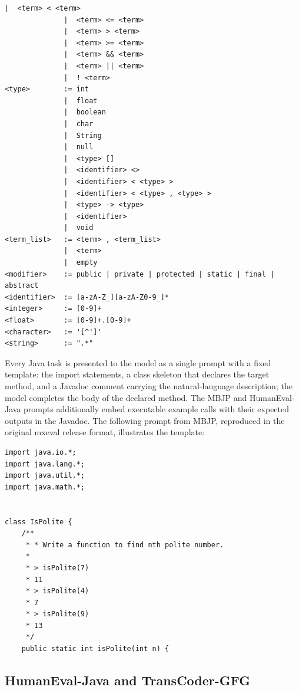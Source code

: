 \begin{tcolorbox}[
    enhanced,
    breakable,
    colback=blue!5!white,
    colframe=blue!50!black,
    title=Java Subset Language Grammar,
    fonttitle=\bfseries,
    boxrule=1pt,
    arc=3pt
]
\begin{Verbatim}[fontsize=\small]
              |  <term> < <term>
              |  <term> <= <term>
              |  <term> > <term>
              |  <term> >= <term>
              |  <term> && <term>
              |  <term> || <term>
              |  ! <term>
<type>        := int
              |  float
              |  boolean
              |  char
              |  String
              |  null
              |  <type> []
              |  <identifier> <>
              |  <identifier> < <type> >
              |  <identifier> < <type> , <type> >
              |  <type> -> <type>
              |  <identifier>
              |  void
<term_list>   := <term> , <term_list>
              |  <term>
              |  empty
<modifier>    := public | private | protected | static | final | abstract
<identifier>  := [a-zA-Z_][a-zA-Z0-9_]*
<integer>     := [0-9]+
<float>       := [0-9]+.[0-9]+
<character>   := '[^']'
<string>      := ".*"
\end{Verbatim}
\end{tcolorbox}

Every Java task is presented to the model as a single prompt with a fixed template: the import statements, a class skeleton that declares the target method, and a Javadoc comment carrying the natural-language description; the model completes the body of the declared method. The MBJP and HumanEval-Java prompts additionally embed executable example calls with their expected outputs in the Javadoc. The following prompt from MBJP, reproduced in the original mxeval release format, illustrates the template:

\begin{tcolorbox}[
    enhanced,
    breakable,
    colback=gray!5,
    colframe=black,
    boxrule=0.5pt,
    arc=2pt,
    left=8pt,
    right=8pt,
    top=8pt,
    bottom=8pt,
    title=Example Java Prompt (MBJP)
]
\begin{Verbatim}[fontsize=\small, xleftmargin=1em]
import java.io.*;
import java.lang.*;
import java.util.*;
import java.math.*;


class IsPolite {
    /**
     * * Write a function to find nth polite number.
     *
     * > isPolite(7)
     * 11
     * > isPolite(4)
     * 7
     * > isPolite(9)
     * 13
     */
    public static int isPolite(int n) {
\end{Verbatim}
\end{tcolorbox}

\subsection{HumanEval-Java and TransCoder-GFG}

